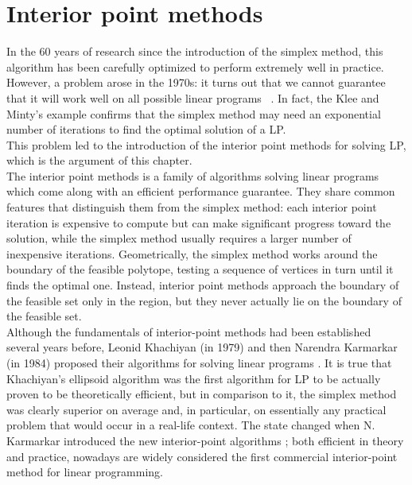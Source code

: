 \documentclass[a4paper,10 pt,titlepage,twoside]{book}
\theoremstyle{plain}
\theoremstyle{definition}
\theoremstyle{remark}
\begin{document}
\chapter{Interior point methods}
In the 60 years of research since the introduction of the simplex method, this algorithm has been carefully optimized to perform extremely well in practice. However, a problem arose in the 1970s: it turns out that we cannot guarantee that it will work well on all possible linear programs ~\cite{3}.
In fact, the Klee and Minty's example confirms that the simplex method may need an exponential number of iterations to find the optimal solution of a LP. \\
This problem led to the introduction of the interior point methods for solving LP, which is the argument of this chapter.\\
The interior point methods is a family of algorithms solving linear programs which come along with an efficient performance guarantee. They share common features that distinguish them from the simplex method: each interior point iteration is expensive to compute but can make significant progress toward the solution, while the simplex method usually requires a larger number of inexpensive iterations. Geometrically, the simplex method works around the boundary of the feasible polytope, testing a sequence of vertices in turn until it finds the optimal one. Instead, interior point methods approach the boundary of the feasible set only in the region, but they never actually lie on the boundary of the feasible set.\\
Although the fundamentals of interior-point methods had been established several years
before, Leonid Khachiyan (in 1979) and then Narendra Karmarkar (in 1984) proposed their algorithms for solving linear programs \cite{WWW}. It is true that Khachiyan’s ellipsoid algorithm was the first algorithm for LP to be actually proven to
be theoretically efficient, but in comparison to it, the simplex method was clearly superior on average and, in particular, on essentially any practical
problem that would occur in a real-life context. The state changed when N. Karmarkar introduced the new interior-point algorithms \cite{Kar}; both efficient in theory and practice, nowadays are widely considered the first commercial interior-point
method for linear programming.\\
\end{document}
